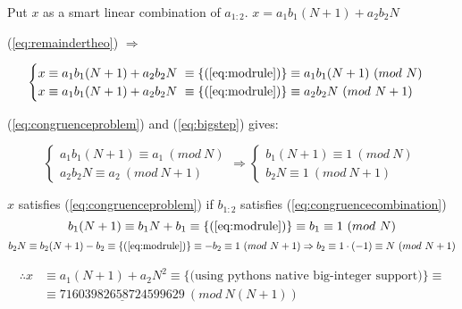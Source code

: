 \documentclass[a4paper,twoside=false,abstract=false,numbers=noenddot,
titlepage=false,headings=small,parskip=half,version=last]{scrartcl}
\begin{document}
Put $x$ as a smart linear combination of $a_{1:2}$. 
$x=a_{1}b_{1}(N+1)+a_{2}b_{2}N$

(\ref{eq:remaindertheo}) $\Rightarrow$

\begin{equation} \label{eq:bigstep}
    \begin{cases}
        x \equiv a_{1}b_{1}(N+1)+a_{2}b_{2}N\ \equiv \{(\ref{eq:modrule})\} \equiv a_{1}b_{1}(N+1)\ (mod\ N)\\
        x \equiv a_{1}b_{1}(N+1)+a_{2}b_{2}N\ \equiv \{(\ref{eq:modrule})\} \equiv a_{2}b_{2}N\ (mod\ N+1)
    \end{cases}
\end{equation}

(\ref{eq:congruenceproblem}) and (\ref{eq:bigstep}) gives:

\begin{equation} \label{eq:congruencecombination}
    \begin{cases}
        a_{1}b_{1}(N+1) \equiv a_{1}\ (mod\ N)\\
        a_{2}b_{2}N \equiv a_{2}\ (mod\ N+1)
    \end{cases}
    \Rightarrow
    \begin{cases}
        b_{1}(N+1) \equiv 1\ (mod\ N)\\
        b_{2}N \equiv 1\ (mod\ N+1)
    \end{cases}
\ %
\end{equation}

$x$ satisfies (\ref{eq:congruenceproblem}) if $b_{1:2}$ satisfies (\ref{eq:congruencecombination})
\begin{equation*}
    b_{1}(N+1) \equiv b_{1}N+b_{1} \equiv \{(\ref{eq:modrule})\} \equiv b_{1} \equiv 1\ (mod\ N) 
\end{equation*}
\begin{equation*}
    b_{2}N \equiv b_{2}(N+1)-b_{2} \equiv \{(\ref{eq:modrule})\} \equiv -b_{2} \equiv 1\ (mod\ N+1)
    \Rightarrow
    b_{2} \equiv 1\cdot (-1) \equiv N\ (mod\ N+1)
\end{equation*}

\begin{equation*}
    \begin{split}
        \therefore x & \equiv a_{1}(N+1)+a_{2}N^{2} \equiv \{\text{(using pythons native big-integer support)}\} \equiv \\
        & \equiv \underline{71603982658724599629}\ (mod\ N(N+1))
    \end{split}
\end{equation*}
\end{document}
